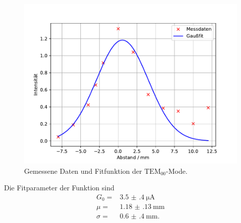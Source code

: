 \begin{figure}
  \centering
  \includegraphics[width = \textwidth, keepaspectratio]{figure/TEM00.pdf}
  \caption{Gemessene Daten und Fitfunktion der $\text{TEM}_{00}$-Mode.}
  \label{fig:TEM00}
\end{figure}
\FloatBarrier
Die Fitparameter der Funktion sind
\begin{align*}
  G_{0}=&\SI{3.5(4)}{\micro\ampere}\\
  \mu =& \SI{1.18(13)}{\milli\meter}\\
  \sigma =& \SI{0.6(4)}{\milli\meter}.
\end{align*}

